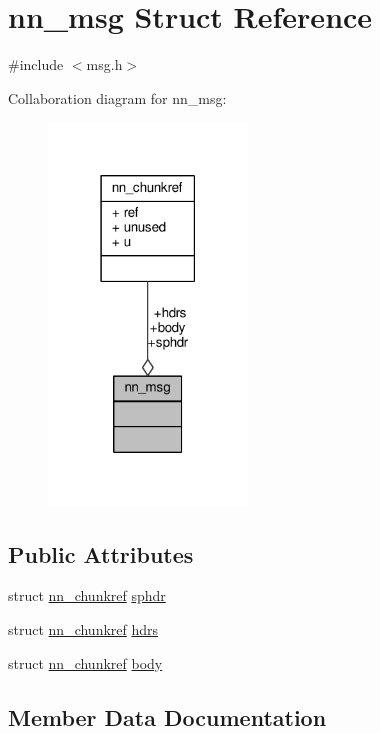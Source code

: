 \hypertarget{structnn__msg}{}\section{nn\+\_\+msg Struct Reference}
\label{structnn__msg}


{\ttfamily \#include $<$msg.\+h$>$}



Collaboration diagram for nn\+\_\+msg\+:\nopagebreak
\begin{figure}[H]
\begin{center}
\leavevmode
\includegraphics[width=150pt]{structnn__msg__coll__graph}
\end{center}
\end{figure}
\subsection*{Public Attributes}
\begin{DoxyCompactItemize}
\item 
struct \hyperlink{structnn__chunkref}{nn\+\_\+chunkref} \hyperlink{structnn__msg_abcd1120a337ed2957e733a0f829a2563}{sphdr}
\item 
struct \hyperlink{structnn__chunkref}{nn\+\_\+chunkref} \hyperlink{structnn__msg_a79cb5562faf3e56ba7922ff9beec621d}{hdrs}
\item 
struct \hyperlink{structnn__chunkref}{nn\+\_\+chunkref} \hyperlink{structnn__msg_ac52dbfdec4cf8d5a0b93d91a4375fd9f}{body}
\end{DoxyCompactItemize}


\subsection{Member Data Documentation}
